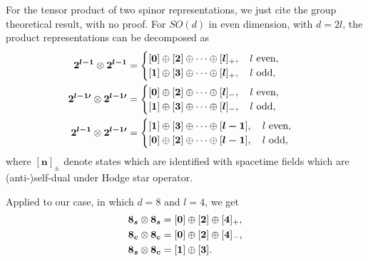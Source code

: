 For the tensor product of two spinor representations, we just cite the group theoretical result, with no proof. For $SO(d)$ in even dimension, with $d = 2l$, the product representations can be decomposed as
\begin{subequations}
\begin{align}
    \boldsymbol{2^{l-1}} \otimes \boldsymbol{2^{l-1}} &= 
    \begin{cases}
        [\boldsymbol{0}] \oplus [\boldsymbol{2}] \oplus \dots \oplus [\boldsymbol{l}]_+, \quad \textup{$l$ even}, \\
        [\boldsymbol{1}] \oplus [\boldsymbol{3}] \oplus \dots \oplus [\boldsymbol{l}]_+, \quad \textup{$l$ odd}, 
    \end{cases} \\
    \boldsymbol{2^{l-1\prime}} \otimes \boldsymbol{2^{l-1\prime}} &= 
    \begin{cases}
        [\boldsymbol{0}] \oplus [\boldsymbol{2}] \oplus \dots \oplus [\boldsymbol{l}]_-, \quad \textup{$l$ even}, \\
        [\boldsymbol{1}] \oplus [\boldsymbol{3}] \oplus \dots \oplus [\boldsymbol{l}]_-, \quad \textup{$l$ odd}, 
    \end{cases}  \\
    \boldsymbol{2^{l-1}} \otimes \boldsymbol{2^{l-1\prime}} &= 
    \begin{cases}
        [\boldsymbol{1}] \oplus [\boldsymbol{3}] \oplus \dots \oplus [\boldsymbol{l-1}], \quad \textup{$l$ even}, \\
        [\boldsymbol{0}] \oplus [\boldsymbol{2}] \oplus \dots \oplus [\boldsymbol{l-1}], \quad \textup{$l$ odd}, 
    \end{cases} 
\end{align}
\end{subequations}
where $[\boldsymbol{n}]_\pm$ denote states which are identified with spacetime fields which are (anti-)self-dual under Hodge star operator.

Applied to our case, in which $d=8$ and $l=4$, we get
\begin{subequations}
\begin{align}
    \boldsymbol{8_s} \otimes \boldsymbol{8_s} &= [\boldsymbol{0}] \oplus [\boldsymbol{2}] \oplus [\boldsymbol{4}]_+ ,\\
    \boldsymbol{8_c} \otimes \boldsymbol{8_c} &= [\boldsymbol{0}] \oplus [\boldsymbol{2}] \oplus [\boldsymbol{4}]_-, \\
    \boldsymbol{8_s} \otimes \boldsymbol{8_c} &= [\boldsymbol{1}] \oplus [\boldsymbol{3}] .\\
\end{align}
\end{subequations}

